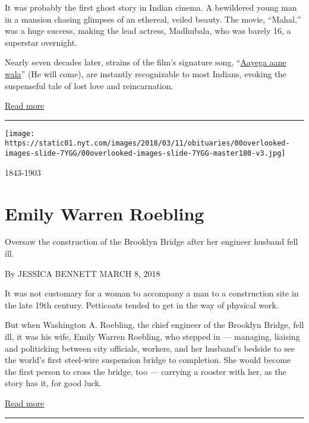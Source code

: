 It was probably the first ghost story in Indian cinema. A bewildered
young man in a mansion chasing glimpses of an ethereal, veiled beauty.
The movie, ``Mahal,'' was a huge success, making the lead actress,
Madhubala, who was barely 16, a superstar overnight.

Nearly seven decades later, strains of the film's signature song,
``\href{https://www.youtube.com/watch?v=03DXW_rV54U}{Aayega aane wala}''
(He will come), are instantly recognizable to most Indians, evoking the
suspenseful tale of lost love and reincarnation.

\href{https://www.nytimes.com/interactive/2018/obituaries/overlooked-madhubala.html}{Read
more}

\begin{center}\rule{0.5\linewidth}{\linethickness}\end{center}

\texttt{[image: https://static01.nyt.com/images/2018/03/11/obituaries/00overlooked-images-slide-7YGG/00overlooked-images-slide-7YGG-master180-v3.jpg]}

1843-1903

\hypertarget{emily-warren-roebling}{%
\section{Emily Warren Roebling}\label{emily-warren-roebling}}

Oversaw the construction of the Brooklyn Bridge after her engineer
husband fell ill.

By JESSICA BENNETT MARCH 8, 2018

It was not customary for a woman to accompany a man to a construction
site in the late 19th century. Petticoats tended to get in the way of
physical work.

But when Washington A. Roebling, the chief engineer of the Brooklyn
Bridge, fell ill, it was his wife, Emily Warren Roebling, who stepped in
--- managing, liaising and politicking between city officials, workers,
and her husband's bedside to see the world's first steel-wire suspension
bridge to completion. She would become the first person to cross the
bridge, too --- carrying a rooster with her, as the story has it, for
good luck.

\href{https://www.nytimes.com/interactive/2018/obituaries/overlooked-emily-warren-roebling.html}{Read
more}

\begin{center}\rule{0.5\linewidth}{\linethickness}\end{center}

